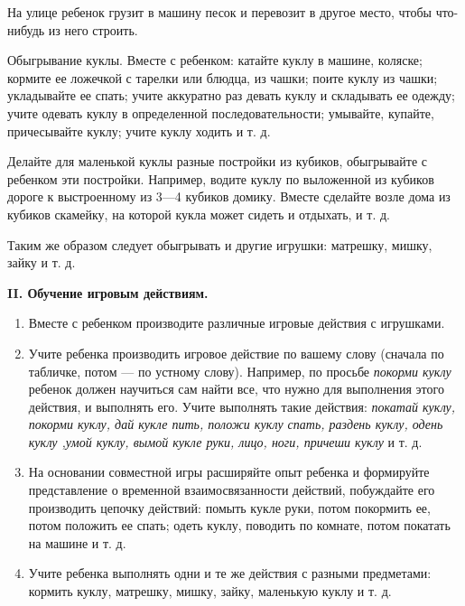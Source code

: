 \documentclass[a5paper]{book}
\renewcommand{\emph}[1]{\textit{#1}}
\begin{document}
На улице ребенок грузит в машину песок и перевозит в другое место, чтобы
что-нибудь из него строить.

Обыгрывание куклы. Вместе с ребенком: катайте куклу в машине, коляске;
кормите ее ложечкой с тарелки или блюдца, из чашки; поите куклу из
чашки; укладывайте ее спать; учите аккуратно раз девать куклу и
складывать ее одежду; учите одевать куклу в определенной
последовательности; умывайте, купайте, причесывайте куклу; учите куклу
ходить и т. д.

Делайте для маленькой куклы разные постройки из кубиков, обыгрывайте с
ребенком эти постройки. Например, водите куклу по выложенной из кубиков
дороге к выстроенному из 3---4 кубиков домику. Вместе сделайте возле
дома из кубиков скамейку, на которой кукла может сидеть и отдыхать, и т.
д.

Таким же образом следует обыгрывать и другие игрушки: матрешку, мишку,
зайку и т. д.

\textbf{II. Обучение игровым действиям.}


\begin{enumerate}
\def\labelenumi{\arabic{enumi}.}
\item
  
  Вместе с ребенком производите различные игровые действия с игрушками.
  
\item
  
  Учите ребенка производить игровое действие по вашему слову (сначала по
  табличке, потом --- по устному слову). Например, по просьбе
  \emph{покорми куклу} ребенок должен научиться сам найти все, что нужно
  для выполнения этого действия, и выполнять его. Учите выполнять такие
  действия: \emph{покатай куклу, покорми куклу, дай кукле пить, положи
  куклу спать, раздень куклу, одень куклу ,умой куклу, вымой кукле руки,
  лицо, ноги, причеши куклу} и т. д.
  
\item
  
  На основании совместной игры расширяйте опыт ребенка и формируйте
  представление о временной взаимосвязанности действий, побуждайте его
  производить цепочку действий: помыть кукле руки, потом покормить ее,
  потом положить ее спать; одеть куклу, поводить по комнате, потом
  покатать на машине и т. д.
  
\item
  
  Учите ребенка выполнять одни и те же действия с разными предметами:
  кормить куклу, матрешку, мишку, зайку, маленькую куклу и т. д.
  
\end{enumerate}
\end{document}
